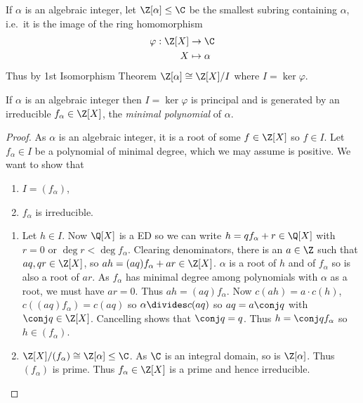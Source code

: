 \documentclass[a4paper]{article}
\theoremstyle{definition}
\begin{document}
If \(\alpha\) is an algebraic integer, let \(\Z[\alpha] \leq \C\) be the smallest subring containing \(\alpha\), i.e.\ it is the image of the ring homomorphism
\begin{align*}
  \varphi: \Z[X] &\to \C \\
  X &\mapsto \alpha
\end{align*}
Thus by 1st Isomorphism Theorem \(\Z[\alpha] \cong \Z[X]/I\) where \(I = \ker \varphi\).

\begin{proposition}
  If \(\alpha\) is an algebraic integer then \(I = \ker \varphi\) is principal and is generated by an irreducible \(f_\alpha \in \Z[X]\), the \emph{minimal polynomial} of \(\alpha\).
\end{proposition}

\begin{proof}
  As \(\alpha\) is an algebraic integer, it is a root of some \(f \in \Z[X]\) so \(f \in I\). Let \(f_\alpha \in I\) be a polynomial of minimal degree, which we may assume is positive. We want to show that
  \begin{enumerate}
  \item \(I = (f_\alpha)\),
  \item \(f_\alpha\) is irreducible.
  \end{enumerate}

  \begin{enumerate}
  \item Let \(h \in I\). Now \(\Q[X]\) is a ED so we can write \(h = qf_\alpha + r \in \Q[X]\) with \(r = 0\) or \(\deg r < \deg f_\alpha\). Clearing denominators, there is an \(a \in \Z\) such that \(aq, qr \in \Z[X]\), so \(ah = (aq) f_\alpha + ar \in \Z[X]\). \(\alpha\) is a root of \(h\) and of \(f_\alpha\) so is also a root of \(ar\). As \(f_\alpha\) has minimal degree among polynomials with \(\alpha\) as a root, we must have \(ar = 0\). Thus \(ah = (aq) f_\alpha\). Now \(c(ah) = a \cdot c(h)\), \(c((aq)f_\alpha) = c(aq)\) so \(\alpha \divides c(aq)\) so \(aq = a\conj q\) with \(\conj q \in \Z[X]\). Cancelling shows that \(\conj q = q\). Thus \(h = \conj q f_\alpha\) so \(h \in (f_\alpha)\).
  \item \(\Z[X]/(f_\alpha) \cong \Z[\alpha] \leq \C\). As \(\C\) is an integral domain, so is \(\Z[\alpha]\). Thus \((f_\alpha)\) is prime. Thus \(f_\alpha \in \Z[X]\) is a prime and hence irreducible.
  \end{enumerate}
\end{proof}
\end{document}
